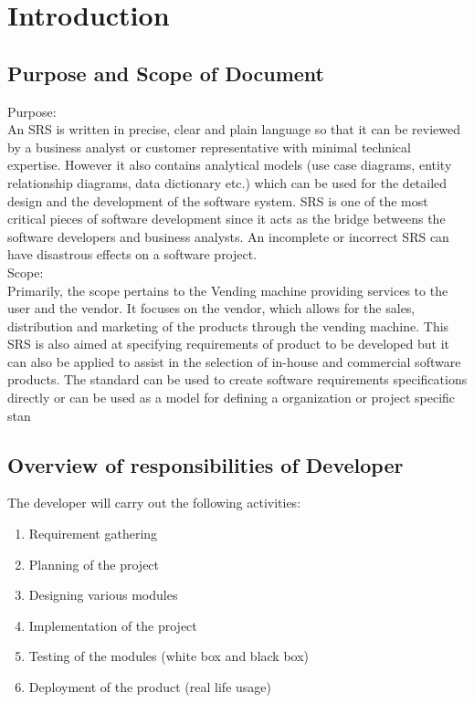 \documentclass[oneside,a4paper,12pt]{report}
\begin{document}
\section{Introduction}
\subsection{Purpose and Scope of Document}
Purpose:\\
An SRS is written in precise, clear and plain language so that it can be reviewed by a business
analyst or customer representative with minimal technical expertise. However it also contains
analytical models (use case diagrams, entity relationship diagrams, data dictionary etc.) which
can be used for the detailed design and the development of the software system. SRS is one of
the most critical pieces of software development since it acts as the bridge betweens the
software developers and business analysts. An incomplete or incorrect SRS can have
disastrous effects on a software project.\\
Scope:\\
Primarily, the scope pertains to the Vending machine providing services to the user and the
vendor. It focuses on the vendor, which allows for the sales, distribution and marketing of the
products through the vending machine.
This SRS is also aimed at specifying requirements of product to be developed but it can also be
applied to assist in the selection of in-house and commercial software products. The standard can
be used to create software requirements specifications directly or can be used as a model for
defining a organization or project specific stan\\
\subsection{Overview of responsibilities of Developer}
The developer will carry out the following activities:
\begin{enumerate}

\item Requirement gathering
\item Planning of the project
\item Designing various modules
\item Implementation of the project
\item Testing of the modules (white box and black box)
\item Deployment of the product (real life usage)

\end{enumerate}
\end{document}

